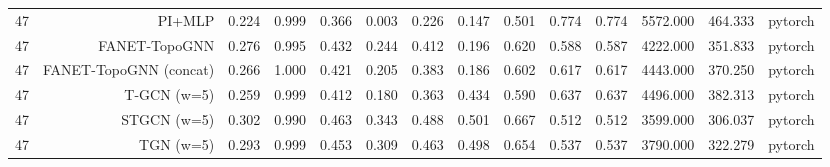 \begin{tabular}{lrrrrrrrrrrrrr}
47 & PI+MLP & 0.224 & 0.999 & 0.366 & 0.003 & 0.226 & 0.147 & 0.501 & 0.774 & 0.774 & 5572.000 & 464.333 & pytorch \\
47 & FANET-TopoGNN & 0.276 & 0.995 & 0.432 & 0.244 & 0.412 & 0.196 & 0.620 & 0.588 & 0.587 & 4222.000 & 351.833 & pytorch \\
47 & FANET-TopoGNN (concat) & 0.266 & 1.000 & 0.421 & 0.205 & 0.383 & 0.186 & 0.602 & 0.617 & 0.617 & 4443.000 & 370.250 & pytorch \\
47 & T-GCN (w=5) & 0.259 & 0.999 & 0.412 & 0.180 & 0.363 & 0.434 & 0.590 & 0.637 & 0.637 & 4496.000 & 382.313 & pytorch \\
47 & STGCN (w=5) & 0.302 & 0.990 & 0.463 & 0.343 & 0.488 & 0.501 & 0.667 & 0.512 & 0.512 & 3599.000 & 306.037 & pytorch \\
47 & TGN (w=5) & 0.293 & 0.999 & 0.453 & 0.309 & 0.463 & 0.498 & 0.654 & 0.537 & 0.537 & 3790.000 & 322.279 & pytorch \\
\bottomrule
\end{tabular}